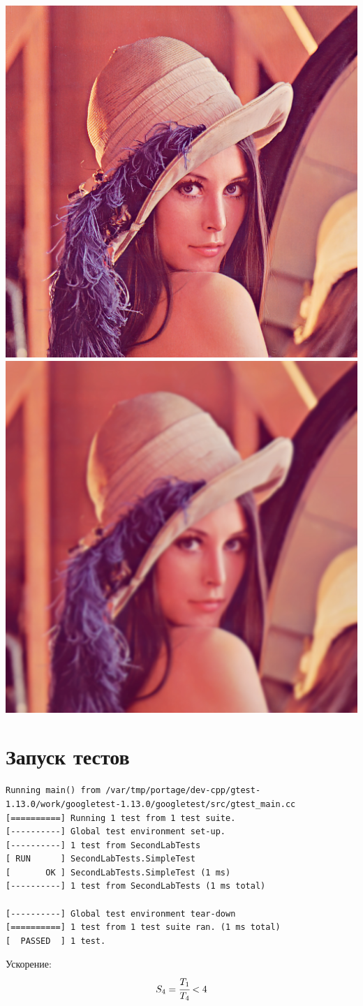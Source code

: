 \documentclass[a4paper, 12pt]{article}
\begin{document}
\includegraphics[width=0.5\linewidth]{lenna.png}
\includegraphics[width=0.5\linewidth]{lenna_blur.png}







\newpage
\section{Запуск тестов}
\begin{verbatim}
Running main() from /var/tmp/portage/dev-cpp/gtest-1.13.0/work/googletest-1.13.0/googletest/src/gtest_main.cc
[==========] Running 1 test from 1 test suite.
[----------] Global test environment set-up.
[----------] 1 test from SecondLabTests
[ RUN      ] SecondLabTests.SimpleTest
[       OK ] SecondLabTests.SimpleTest (1 ms)
[----------] 1 test from SecondLabTests (1 ms total)

[----------] Global test environment tear-down
[==========] 1 test from 1 test suite ran. (1 ms total)
[  PASSED  ] 1 test.
\end{verbatim}
%
Ускорение:
\begin{equation}
    S_4 = \cfrac{T_1}{T_4} < 4
\end{equation}
\end{document}

